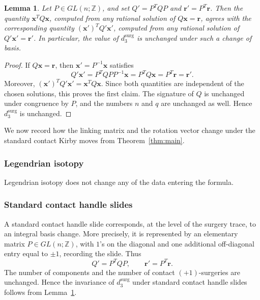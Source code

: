 \documentclass{amsart}
\numberwithin{equation}{section}
\numberwithin{figure}{section}
\newtheorem{lemma}[theorem]{Lemma}
\theoremstyle{definition}
\theoremstyle{remark}
\begin{document}
\begin{lemma}\label{lem:d3-basis}
Let \(P\in GL(n;\mathbb Z)\), and set \(Q'=P^TQP\) and \(\boldsymbol r'=P^T\boldsymbol r\). Then the quantity \(\boldsymbol x^TQ\boldsymbol x\), computed from any rational solution of \(Q\boldsymbol x=\boldsymbol r\), agrees with the corresponding quantity \((\boldsymbol x')^TQ'\boldsymbol x'\), computed from any rational solution of \(Q'\boldsymbol x'=\boldsymbol r'\). In particular, the value of \(d_3^{\mathrm{surg}}\) is unchanged under such a change of basis.
\end{lemma}

\begin{proof}
If \(Q\boldsymbol x=\boldsymbol r\), then \(\boldsymbol x'=P^{-1}\boldsymbol x\) satisfies
\[
Q'\boldsymbol x'
=
P^TQPP^{-1}\boldsymbol x
=
P^TQ\boldsymbol x
=
P^T\boldsymbol r
=
\boldsymbol r'.
\]
Moreover, $(\boldsymbol x')^TQ'\boldsymbol x'=\boldsymbol x^TQ\boldsymbol x$.
Since both quantities are independent of the chosen solutions, this proves the first claim. The signature of \(Q\) is unchanged under congruence by \(P\), and the numbers \(n\) and \(q\) are unchanged as well. Hence \(d_3^{\mathrm{surg}}\) is unchanged.
\end{proof}

We now record how the linking matrix and the rotation vector change under the standard contact Kirby moves from Theorem~\ref{thm:main}.

\subsubsection*{Legendrian isotopy}

Legendrian isotopy does not change any of the data entering the formula.

\subsubsection*{Standard contact handle slides}

A standard contact handle slide corresponds, at the level of the surgery trace, to an integral basis change. More precisely, it is represented by an elementary matrix \(P\in GL(n;\mathbb Z)\), with \(1\)'s on the diagonal and one additional off-diagonal entry equal to \(\pm1\), recording the slide. Thus
\[
Q'=P^TQP,
\qquad
\boldsymbol r'=P^T\boldsymbol r.
\]
The number of components and the number of contact \((+1)\)-surgeries are unchanged. Hence the invariance of \(d_3^{\mathrm{surg}}\) under standard contact handle slides follows from Lemma~\ref{lem:d3-basis}.
\end{document}
